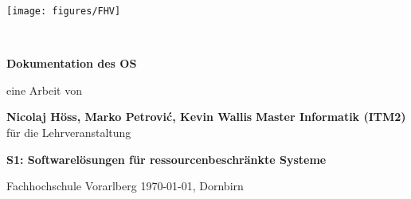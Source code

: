 \documentclass[11pt]{scrartcl}
\title{\mytitle}
\author{\myauthor}
\date{\today{}, Dornbirn}
\newcommand{\myauthor}{Nicolaj Höss, Marko Petrovi\'c, Kevin Wallis}
\newcommand{\mytitle}{Dokumentation des OS}
\newcommand{\myuniversity}{Fachhochschule Vorarlberg}
\newcommand{\mycourse}{S1: Softwarelösungen für ressourcenbeschränkte Systeme}
\newcommand{\mystudy}{Master Informatik (ITM2)}
\newcommand{\mydate}{\today{}, Dornbirn}
\begin{document}
\begin{titlepage}

\begin{minipage}{.5\textwidth} 
  \hspace{12cm}\hfill \texttt{[image: figures/FHV]} 
\end{minipage}\vspace{2cm} 

\begin{center}
~
\vfill\vfill\vfill

{\Huge\bfseries\mytitle}

\vfill

\Large{eine Arbeit von}

\vfill

{\LARGE\bfseries\myauthor}
\vfill
{\Large\bfseries\mystudy}
\vfill
\vfill
\Large{für die Lehrveranstaltung}

\vfill

{\LARGE\bfseries\mycourse}

\vfill\vfill\vfill
\vfill\vfill\vfill
\vfill\vfill\vfill

\myuniversity
\vfill
\mydate
\end{center}
\end{titlepage}



\thispagestyle{plain}
\tableofcontents

\listoffigures

\pagebreak








\clearpage
{}
{}

\end{document}
